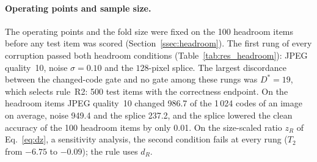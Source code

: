
\paragraph{Operating points and sample size.}
The operating points and the fold size were fixed on the 100 headroom items before any test item was scored (Section~\ref{ssec:headroom}).
The first rung of every corruption passed both headroom conditions (Table~\ref{tab:res_headroom}): JPEG quality~10, noise
$\sigma=0.10$ and the $128$-pixel splice.
The largest discordance between the changed-code gate and no gate among these rungs was $D^\ast=19$, which selects rule~R2: 500 test
items with the correctness endpoint.
On the headroom items JPEG quality~10 changed 986.7 of the 1\,024 codes of an image on average, noise 949.4 and the splice 237.2, and
the splice lowered the clean accuracy of the 100 headroom items by only 0.01.
On the size-scaled ratio $z_R$ of Eq.~\eqref{eq:dz}, a sensitivity analysis, the second condition fails at every rung ($T_2$ from
$-6.75$ to $-0.09$); the rule uses $d_R$.

